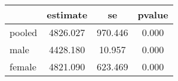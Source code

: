 \begin{table}[htbp]
\begin{tabular}{lccc} \hline \hline
 & estimate  & se  & pvalue  \\  \hline 
pooled &  4826.027 &   970.446 &     0.000 \\  
male &  4428.180 &    10.957 &     0.000 \\  
female &  4821.090 &   623.469 &     0.000 \\  
\hline \hline \end{tabular}
\end{table}
